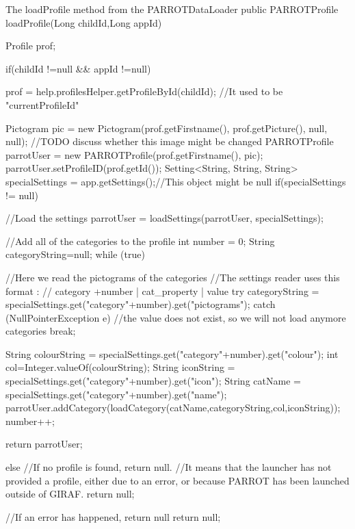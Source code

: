 \begin{source}[{lPf}]{The loadProfile method from the PARROTDataLoader}
public PARROTProfile loadProfile(Long childId,Long appId)	
	{
		Profile prof;

		if(childId !=null && appId !=null)
		{
			prof = help.profilesHelper.getProfileById(childId);	//It used to be "currentProfileId"

			Pictogram pic = new Pictogram(prof.getFirstname(), prof.getPicture(), null, null);	//TODO discuss whether this image might be changed
			PARROTProfile parrotUser = new PARROTProfile(prof.getFirstname(), pic);
			parrotUser.setProfileID(prof.getId());
			Setting<String, String, String> specialSettings = app.getSettings();//This object might be null
			if(specialSettings != null)
			{
				//Load the settings
				parrotUser = loadSettings(parrotUser, specialSettings);

				//Add all of the categories to the profile
				int number = 0;
				String categoryString=null;
				while (true)
				{
					//Here we read the pictograms of the categories
					//The settings reader uses this format :
					// category +number | cat_property | value
					try
					{
						categoryString = specialSettings.get("category"+number).get("pictograms");
					}
					catch (NullPointerException e)
					{
						//the value does not exist, so we will not load anymore categories
						break;
					}

					String colourString = specialSettings.get("category"+number).get("colour");
					int col=Integer.valueOf(colourString);
					String iconString = specialSettings.get("category"+number).get("icon");
					String catName = specialSettings.get("category"+number).get("name");
					parrotUser.addCategory(loadCategory(catName,categoryString,col,iconString));
					number++;
				}

				return parrotUser;
			}
			else
			{
				//If no profile is found, return null.
				//It means that the launcher has not provided a profile, either due to an error, or because PARROT has been launched outside of GIRAF.
				return null;
			}
		}
		//If an error has happened, return null
		return null;


	}
\end{source}

